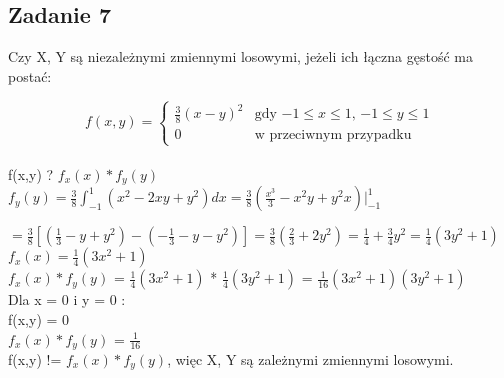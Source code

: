 \subsection{Zadanie 7}

Czy X, Y są niezależnymi zmiennymi losowymi, jeżeli ich łączna gęstość ma postać:

$$
f(x,y)
 = \left\{ \begin{array}{ll}
\frac{3}{8}(x-y)^2& \textrm{gdy $-1 \leq x \leq 1$, $-1 \leq y \leq 1$}\\
0 & \textrm{w przeciwnym przypadku}
\end{array} \right.
$$ \\

f(x,y) ? $f_x(x)*f_y(y)$ \\

$f_y(y) = \frac{3}{8} \int_{-1}^{1}(x^2 - 2xy + y^2)dx = \frac{3}{8} (\frac{x^3}{3} - x^2 y + y^2x) \Bigg|^{1}_{-1} $

$ = \frac{3}{8}[(\frac{1}{3} - y + y^2) - (-\frac{1}{3} - y -y^2)] = \frac{3}{8}(\frac{2}{3} + 2y^2) = \frac{1}{4} + \frac{3}{4}y^2 = \frac{1}{4}(3y^2 + 1)$ \\

$f_x(x) = \frac{1}{4}(3x^2 + 1)$ \\

$f_x(x)*f_y(y)$ = $\frac{1}{4}(3x^2 + 1)$ * $\frac{1}{4}(3y^2 + 1)$ = $\frac{1}{16}(3x^2 + 1)(3y^2 + 1)$\\

Dla x = 0 i y = 0 :\\

f(x,y) = 0 \\

$f_x(x)*f_y(y)$ = $\frac{1}{16}$ \\

f(x,y) != $f_x(x)*f_y(y)$, więc X, Y są zależnymi zmiennymi losowymi.
